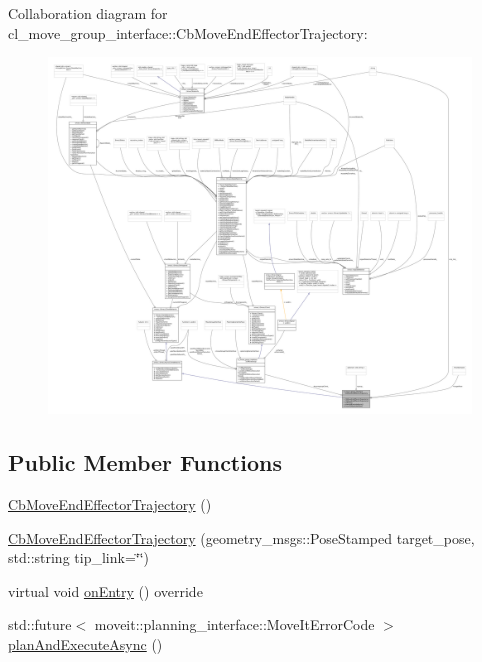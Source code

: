 Collaboration diagram for cl\+\_\+move\+\_\+group\+\_\+interface\+:\+:Cb\+Move\+End\+Effector\+Trajectory\+:
\nopagebreak
\begin{figure}[H]
\begin{center}
\leavevmode
\includegraphics[width=350pt]{classcl__move__group__interface_1_1CbMoveEndEffectorTrajectory__coll__graph}
\end{center}
\end{figure}
\subsection*{Public Member Functions}
\begin{DoxyCompactItemize}
\item 
\hyperlink{classcl__move__group__interface_1_1CbMoveEndEffectorTrajectory_a65521ae766086fe31c46e9a0a18a2198}{Cb\+Move\+End\+Effector\+Trajectory} ()
\item 
\hyperlink{classcl__move__group__interface_1_1CbMoveEndEffectorTrajectory_ab3fddd67f7692ce5312fdfaf9af28e72}{Cb\+Move\+End\+Effector\+Trajectory} (geometry\+\_\+msgs\+::\+Pose\+Stamped target\+\_\+pose, std\+::string tip\+\_\+link=\char`\"{}\char`\"{})
\item 
virtual void \hyperlink{classcl__move__group__interface_1_1CbMoveEndEffectorTrajectory_aaedd074fd178c6390a4a3f1ccff23ad3}{on\+Entry} () override
\item 
std\+::future$<$ moveit\+::planning\+\_\+interface\+::\+Move\+It\+Error\+Code $>$ \hyperlink{classcl__move__group__interface_1_1CbMoveEndEffectorTrajectory_a8490f52e1f8cb280657965b544bfed30}{plan\+And\+Execute\+Async} ()
\end{DoxyCompactItemize}
